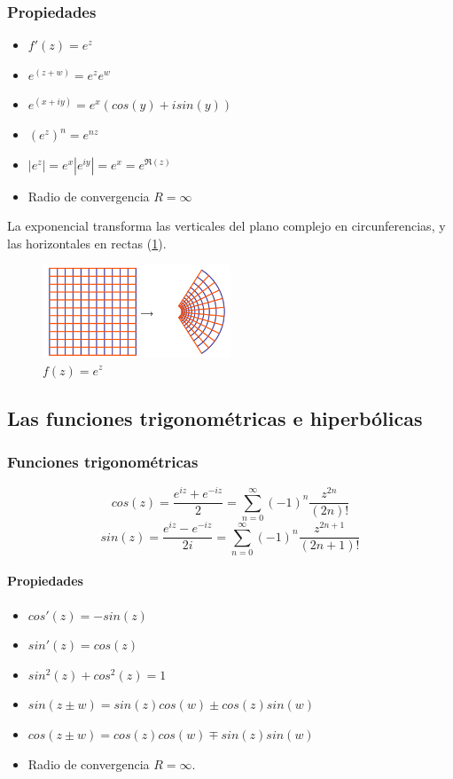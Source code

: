 \documentclass[paper=a4, fontsize=11pt]{scrartcl}
\numberwithin{equation}{section}
\numberwithin{figure}{section}
\numberwithin{table}{section}
\begin{document}
\subsubsection{Propiedades}
\begin{itemize}
\item $f'(z) = e^z$
\item $e^{(z+w)}=e^ze^w$
\item $e^{(x+iy)}=e^x(cos(y)+isin(y))$
\item $(e^z)^n=e^{nz}$
\item $|e^z| = e^x|e^{iy}|=e^x= e^{\Re(z)}$
\item Radio de convergencia $R=\infty$
\end{itemize}

La exponencial transforma las verticales del plano complejo en circunferencias, y las horizontales en rectas (\ref{fig:exp}).
\begin{figure}[htbp]
\centering
\includegraphics[width=0.5\textwidth]{exp.png}
\caption{$f(z)=e^z$}
\label{fig:exp}
\end{figure}


\subsection{Las funciones trigonométricas e hiperbólicas}
\subsubsection{Funciones trigonométricas}

$$cos(z) = \frac{e^{iz}+e^{-{iz}}}{2} = \sum_{n=0}^\infty(-1)^n\frac{z^{2n}}{(2n)!}$$
$$sin(z) = \frac{e^{iz}-e^{-{iz}}}{2i} = \sum_{n=0}^\infty(-1)^n\frac{z^{2n+1}}{(2n+1)!}$$

\paragraph{Propiedades}
\begin{itemize}
\item $cos'(z) = -sin(z)$
\item $sin'(z) = cos(z)$
\item $sin^2(z)+cos^2(z) = 1$
\item $sin(z\pm w) = sin(z)cos(w)\pm cos(z)sin(w)$
\item $cos(z\pm w) = cos(z)cos(w)\mp sin(z)sin(w)$
\item Radio de convergencia $R=\infty$.
\end{itemize}
\end{document}
